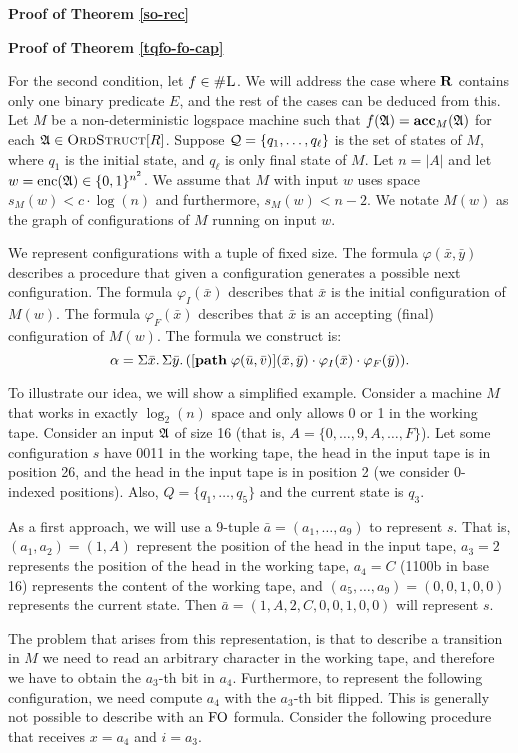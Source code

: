 \textbf{Proof of Theorem \ref{so-rec}}


\textbf{Proof of Theorem \ref{tqfo-fo-cap}}

For the second condition, let $f \in \text{\sc \#L}$. We will address the case where $\mathbf{R}$ contains only one binary predicate $E$, and the rest of the cases can be deduced from this. Let $M$ be a non-deterministic logspace machine such that $f(\mathfrak{A}) = \textbf{acc}_M(\mathfrak{A})$ for each $\mathfrak{A} \in \text{\sc OrdStruct}[R]$. Suppose ${\cal Q} = \{q_1,\ldots,q_{\ell}\}$ is the set of states of $M$, where $q_1$ is the initial state, and $q_{\ell}$ is only final state of $M$. Let $n = \vert A \vert$ and let $w = {\rm enc}(\mathfrak{A}) \in \{0,1\}^{n^2}$. We assume that $M$ with input $w$ uses space $s_M(w) < c\cdot\log(n)$ and furthermore, $s_M(w) < n-2$. We notate $M(w)$ as the graph of configurations of $M$ running on input $w$.

We represent configurations with a tuple of fixed size. The formula $\varphi(\bar{x},\bar{y})$ describes a procedure that given a configuration generates a possible next configuration. The formula $\varphi_I(\bar{x})$ describes that $\bar{x}$ is the initial configuration of $M(w)$. The formula $\varphi_F(\bar{x})$ describes that $\bar{x}$ is an accepting (final) configuration of $M(w)$. The formula we construct is:
$$
\alpha = \Sigma{\bar{x}}.\,\Sigma{\bar{y}}.\,([{\bf path} \; \varphi(\bar{u},\bar{v})](\bar{x},\bar{y})\cdot \varphi_I(\bar{x})\cdot\varphi_F(\bar{y})).
$$

To illustrate our idea, we will show a simplified example. Consider a machine $M$ that works in exactly $\log_2(n)$ space and only allows 0 or 1 in the working tape. Consider an input $\mathfrak{A}$ of size 16 (that is, $A = \{0,\ldots,9,A,\ldots,F\}$). Let some configuration $s$ have 0011 in the working tape, the head in the input tape is in position 26, and the head in the input tape is in position 2 (we consider 0-indexed positions). Also, $Q = \{q_1,\ldots,q_5\}$ and the current state is $q_3$.

As a first approach, we will use a 9-tuple $\bar{a} = (a_1,\ldots,a_9)$ to represent $s$. That is, $(a_1,a_2) = (1,A)$ represent the position of the head in the input tape, $a_3 = 2$ represents the position of the head in the working tape, $a_4 = C$ (1100b in base 16) represents the content of the working tape, and $(a_5,\ldots,a_9) = (0,0,1,0,0)$ represents the current state. Then $\bar{a} = (1,A,2,C,0,0,1,0,0)$ will represent $s$.

The problem that arises from this representation, is that to describe a transition in $M$ we need to read an arbitrary character in the working tape, and therefore we have to obtain the $a_3$-th bit in $a_4$. Furthermore, to represent the following configuration, we need compute $a_4$ with the $a_3$-th bit flipped. This is generally not possible to describe with an ${\rm FO}$ formula. Consider the following procedure that receives $x = a_4$ and $i = a_3$.

